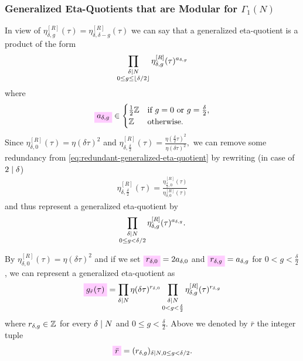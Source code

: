 \documentclass{article}
\begin{document}
\subsubsection{Generalized Eta-Quotients that are Modular for $\Gamma_1(N)$}

In view of $\eta_{\delta,g}^{[R]}(\tau) = \eta_{\delta,\delta-g}^{[R]}(\tau)$ we
can say that a generalized eta-quotient is a product of the form
\begin{gather}
  \prod_{\substack{\delta \mid N\\ 0\le g \le \lfloor\delta/2\rfloor}}
       \eta_{\delta,g}^{[R]}(\tau)^{a_{\delta,g}}
\end{gather}
where
\begin{gather}
  \defineNotation[a-delta-g]{a_{\delta,g}}\in
  \begin{cases}
    \frac{1}{2}\setZ & \text{if $g=0$ or $g=\frac{\delta}{2}$},\\
    \setZ & \text{otherwise}.
  \end{cases}
\end{gather}
Since $\eta_{\delta,0}^{[R]}(\tau) = \eta(\delta\tau)^2$ and
$\eta_{\delta,\frac{\delta}{2}}^{[R]}(\tau)
=
\frac{\eta(\frac{\delta}{2}\tau)^2}{\eta(\delta\tau)^2},
$
we can remove some redundancy from
\eqref{eq:redundant-generalized-eta-quotient} by rewriting (in case of
$2 \mid \delta$)
\begin{gather}
  \eta_{\delta,\frac{\delta}{2}}^{[R]}(\tau)
  =
  \frac{\eta_{\frac{\delta}{2}, 0}^{[R]}(\tau)}{\eta_{\delta,0}^{[R]}(\tau)}
\end{gather}
and thus represent a generalized eta-quotient by
\begin{gather}
  \prod_{\substack{\delta \mid N\\0\le g < \delta/2}}
       \eta_{\delta,g}^{[R]}(\tau)^{a_{\delta,g}}.
  \label{eq:redundant-generalized-eta-quotient}
\end{gather}

By $\eta_{\delta,0}^{[R]}(\tau) = \eta(\delta\tau)^2$ and if we set
$\defineNotation[r-delta-0]{r_{\delta,0}} = 2 a_{\delta,0}$ and
$\defineNotation[r-delta-g]{r_{\delta,g}}=a_{\delta,g}$ for $0<g<\frac{\delta}{2}$, we can
represent a generalized eta-quotient as
\begin{gather}
  \defineNotation[g-rbar-tau]{g_{\bar{r}}(\tau)} =
  \prod_{\delta|N} \eta(\delta\tau)^{r_{\delta,0}}
  \prod_{\substack{\divides{\delta}{N}\\0 < g < \frac{\delta}{2}}}
  \eta_{\delta,g}^{[R]}(\tau)^{r_{\delta,g}}
  \label{eq:g_rbar(tau)}
\end{gather}
where $ r_{\delta,g} \in\mathbb{Z}$ for every
$\delta \mid N$ and $0 \le g< \frac{\delta}{2}$.
Above we denoted by $\bar{r}$ the integer tuple
\begin{gather*}
  \defineNotation[rbar]{\bar{r}}
  =
  (r_{\delta,g})_{\divides{\delta}{N}, 0\le g < \delta/2}.
\end{gather*}
\end{document}

